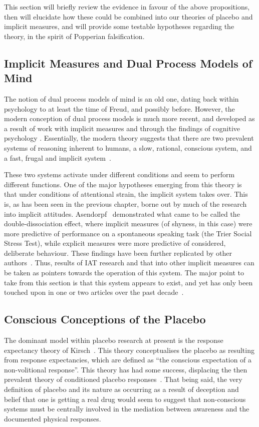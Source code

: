 This section will briefly review the evidence in favour of the above propositions, then will elucidate how these could be combined into our theories of placebo and implicit measures, and will provide some testable hypotheses regarding the theory, in the spirit of Popperian falsification.

\subsection{Implicit Measures and Dual Process Models of Mind}

The notion of dual process models of mind is an old one, dating back within psychology to at least the time of Freud, and possibly before. However, the modern conception of dual process models is much more recent, and developed as a result of work with implicit measures and through the findings of cognitive psychology \cite{Kahneman2002,Greenwald1995a,Gigerenzer2011,Klauer2007}. Essentially, the modern theory suggests that there are two prevalent systems of reasoning inherent to humans, a slow, rational, conscious system, and a fast, frugal and implicit system~\cite{Kahneman2002}. 

These two systems activate under different conditions and seem to perform different functions. One of the major hypotheses emerging from this theory is that under conditions of attentional strain, the implicit system takes over. This is, as has been seen in the previous chapter, borne out by much of the research into implicit attitudes. Asendorpf~\cite{Asendorpf2002} demonstrated what came to be called the double-dissociation effect, where implicit measures (of shyness, in this case) were more predictive of performance on a spontaneous speaking task (the Trier Social Stress Test), while explicit measures were more predictive of considered, deliberate behaviour. These findings have been further replicated by other authors~\cite{Richetin2007}.   Thus, results of  IAT research and that into other implicit measures can be taken as pointers towards the operation of this system. The major point to take from this section is that this system appears to exist, and yet has only been touched upon in one or two articles over the past decade~\cite{Geers2005}. 

\subsection{Conscious Conceptions of the Placebo}

The dominant model within placebo research at present is the response expectancy theory of Kirsch~\cite{Kirsch1985, Kirsch1997}. This theory conceptualises the placebo as resulting from response expectancies, which are defined as ``the conscious expectation of a non-volitional response''. This theory has had some success, displacing the then prevalent theory of conditioned placebo responses~\cite{Voudouris1985,Voudouris1989}. That being said, the very definition of placebo and its nature as occurring as a result of deception and belief that one is getting a real drug would seem to suggest that non-conscious systems must be centrally involved in the mediation between awareness and the documented physical responses. 

